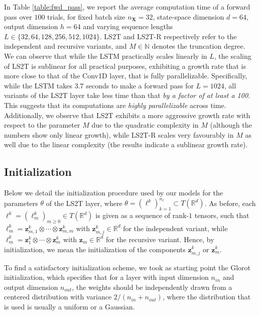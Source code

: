 \documentclass{article} \usepackage{iclr2021_conference,times}
\newcommand{\R}{\mathbb{R}}
\newcommand{\bX}{\mathbf{X}}
\newcommand{\bz}{\mathbf{z}}
\newcommand{\NN}{\mathbb{N}}
\theoremstyle{plain}
\theoremstyle{definition}
\begin{document}
In Table \ref{table:fwd_pass}, we report the average computation time of a forward pass over $100$ trials, for fixed batch size $n_\bX = 32$, state-space dimension $d = 64$, output dimension $h = 64$ and varying sequence lengths $L \in \{32, 64, 128, 256, 512, 1024\}$. LS2T and LS2T-R respectively refer to the independent and recursive variants, and $M \in \NN$ denotes the truncation degree. We can observe that while the LSTM practically scales linearly in $L$, the scaling of LS2T is sublinear for all practical purposes, exhibiting a growth rate that is more close to that of the Conv1D layer, that is fully parallelizable. Specifically, while the LSTM takes $3.7$ seconds to make a forward pass for $L=1024$, all variants of the LS2T layer take less time than that \emph{by a factor of at least a 100}. This suggests that its computations are \emph{highly parallelizable} across time. Additionally, we observe that LS2T exhibits a more aggressive growth rate with respect to the parameter $M$ due to the quadratic complexity in $M$ (although the numbers show only linear growth), while LS2T-R scales very favourably in $M$ as well due to the linear complexity (the results indicate a sublinear growth rate).



\subsection{Initialization}\label{app:init}
Below we detail the initialization procedure used by our models for the parameters $\theta$ of the LS2T layer, where $\theta = (\ell^k)_{k=1}^{n_\ell} \subset T(\R^d)$. As before, each $\ell^k = (\ell^k_{m})_{m \geq 0} \in T(\R^d)$ is given as a sequence of rank-$1$ tensors, such that $\ell^k_m = \bz^k_{m, 1} \otimes \cdots \otimes \bz^k_{m,m}$ with $\bz^k_{m, j} \in \R^d$ for the independent variant, while $\ell^k_m = \bz_1^k \otimes \cdots \otimes \bz_m^k$ with $\bz_m \in \R^d$ for the recursive variant. Hence, by initialization, we mean the initialization of the components $\bz^k_{m, j}$ or $\bz^k_m$.

To find a satisfactory initialization scheme, we took as starting point the Glorot \citep{glorot2010understanding} initialization, which specifies that for a layer with input dimension $n_{in}$ and output dimension $n_{out}$, the weights should be independently drawn from a centered distribution with variance $2 / (n_{in} + n_{out})$, where the distribution that is used is usually a uniform or a Gaussian.
\end{document}
